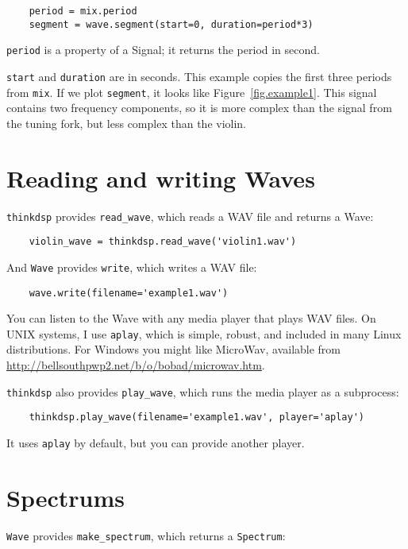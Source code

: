 \documentclass[12pt]{book}
\begin{document}
\begin{verbatim}
    period = mix.period
    segment = wave.segment(start=0, duration=period*3)
\end{verbatim}

{\tt period} is a property of a Signal; it returns the period in second.

{\tt start} and {\tt duration} are in seconds.  This example copies
the first three periods from {\tt mix}.  If we plot {\tt segment}, it
looks like Figure~\ref{fig.example1}.  This signal contains two
frequency components, so it is more complex than the signal from the
tuning fork, but less complex than the violin.


\section{Reading and writing Waves}

{\tt thinkdsp} provides \verb"read_wave", which reads a WAV
file and returns a Wave:

\begin{verbatim}
    violin_wave = thinkdsp.read_wave('violin1.wav')
\end{verbatim}

And {\tt Wave} provides {\tt write}, which writes a WAV file:

\begin{verbatim}
    wave.write(filename='example1.wav')
\end{verbatim}

You can listen to the Wave with any media player that plays WAV
files.  On UNIX systems, I use {\tt aplay}, which is simple, robust,
and included in many Linux distributions.  For Windows you might like
MicroWav, available from
\url{http://bellsouthpwp2.net/b/o/bobad/microwav.htm}.

{\tt thinkdsp} also provides \verb"play_wave", which runs
the media player as a subprocess:

\begin{verbatim}
    thinkdsp.play_wave(filename='example1.wav', player='aplay')
\end{verbatim}

It uses {\tt aplay} by default, but you can provide another player.


\section{Spectrums}

{\tt Wave} provides \verb"make_spectrum", which returns a
{\tt Spectrum}:
\end{document}
